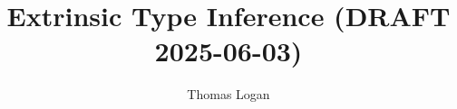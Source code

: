 \documentclass[acmsmall]{acmart}
\title{Extrinsic Type Inference (DRAFT 2025-06-03)}
\author{Thomas Logan}
\newcounter{pdc}
\newcounter{sdc}
\theoremstyle{definition}
\begin{document}
\newcommand{\pdc}{\stepcounter{pdc}\arabic{pdc}}
\newcommand{\sdc}{\stepcounter{sdc}\arabic{sdc}}

\newcommand{\Par}[1]{\paragraph{\textbf{#1}}}
\newcommand{\J}[1]{\texttt{\fontfamily{pcr}\selectfont #1}}
\newcommand{\lab}[1]{\text{\color{Gray}\ [#1]}}
\newcommand{\entails}{\vdash}
\newcommand{\satisfies}{\vDash}
\newcommand{\given}{\dashv}
\newcommand{\with}{\ \diamond\ }
\newcommand{\notfree}{\ \#\ }
\newcommand{\consis}{\ \star}
\newcommand{\safe}{\ \checkmark}
\newcommand{\relational}{\ \Re}


\newcommand{\pass}{\text{\normalsize \color{Green} \ding{51}}}
\newcommand{\assisted}{\text{\normalsize \color{Purple} \ding{45}}}
\newcommand{\fail}{\text{\normalsize \color{red} \ding{55}}}

\newcommand{\unique}{\ \dagger}

\newcommand{\factorsinto}{\Vdash}


\newcommand{\allsafe}{\ \Re\checkmark}

\newcommand{\qua}{\ .\ }



\newcommand{\ignore}{\varnothing}
\newcommand{\dTheta}{\dot{\Theta}}
\newcommand{\closed}{\bullet}
\newcommand{\local}{\blacktriangle}
\newcommand{\open}{\circ}



\newcommand{\up}{\ \land\ }
\newcommand{\down}{\ \lor\ }


\newcommand{\multi}[1]{\widebar{\ #1\ }}
\newcommand{\hastype}{:}
\newcommand{\pattype}{\ \lozenge\ }
\newcommand{\liftfun}{:}

\newcommand{\sz}[1]{\text{\small #1}}


\newcommand{\block}[1]{{\footnotesize \[
  \begin{array}[t]{@{} l}
    #1
  \end{array}
\]}}

\newcommand{\ms}[1]{{\footnotesize $(#1)$}}

\newcommand{\code}[1]{\ms{\J{#1}}}


\newcommand{\R}[1]{\color{teal}\ \ [\emph{#1}]}
 
\newcommand{\subtypes}{<:}
\newcommand{\supertypes}{:>}
\newcommand{\I}{\hspace{4mm}}
\newcommand{\Z}{.\hspace{4mm}}
\newcommand{\Alpha}{\mathrm{A}}
\newcommand{\Tau}{\mathrm{T}}
\newcommand{\B}[1]{\textbf{#1}}
\newcommand{\F}[1]{\text{#1}}
\newcommand{\bigand}{\bigwedge\nolimits}
\newcommand{\bigor}{\bigvee\nolimits}
\newcommand{\C}[1]{\color{teal} \rhd\ \emph{#1}}
\newcommand{\com}[1]{\I \emph{#1}}
\newcommand{\D}[1]{\small \textsc{#1}}
\newcommand{\FIG}[1]{Fig. {\color{red} \ref{#1}}}
\newcommand{\TODO}[1]{\noindent \B{\color{red} TODO: #1}}
\end{document}
